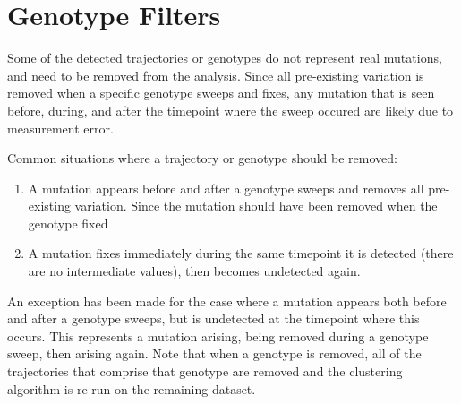\documentclass{report}
\begin{document}
\chapter{Genotype Filters}
Some of the detected trajectories or genotypes do not represent real mutations, and need to be removed from the analysis. 
Since all pre-existing variation is removed when a specific genotype sweeps and fixes, any mutation that is seen before, during, 
and after the timepoint where the sweep occured are likely due to measurement error.

Common situations where a trajectory or genotype should be removed:

\begin{enumerate}
\item A mutation appears before and after a genotype sweeps and removes all pre-existing variation. Since the mutation should have been removed when the genotype fixed
\item A mutation fixes immediately during the same timepoint it is detected (there are no intermediate values), then becomes undetected again.
\end{enumerate}

An exception has been made for the case where a mutation appears both before and after a genotype sweeps, but is undetected at the timepoint where this occurs. 
This represents a mutation arising, being removed during a genotype sweep, then arising again.
Note that when a genotype is removed, all of the trajectories that comprise that genotype are removed and the clustering algorithm is re-run on the remaining dataset. 
\end{document}
